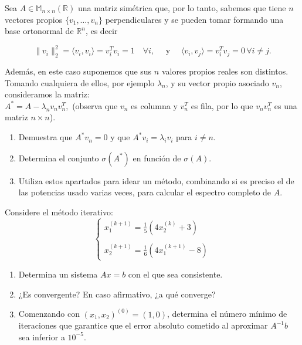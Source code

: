 \documentclass[12pt]{article}
\begin{document}
	\begin{ejercicio}[3 puntos]
		Sea $A \in \mathbb{M}_{n \times n}(\mathbb{R})$ una matriz simétrica que, por lo tanto, sabemos que tiene $n$ vectores propios $\{v_1, \dots, v_n\}$ perpendiculares y se pueden tomar formando una base ortonormal de $\mathbb{R}^n$, es decir
		
		$$\|v_i\|_2^2 = \langle v_i, v_i \rangle = v_i^T v_i = 1 \quad \forall i, \quad \text{ y } \quad \langle v_i, v_j \rangle = v_i^T v_j = 0 \, \forall i \neq j.$$
		
		Además, en este caso suponemos que sus $n$ valores propios reales son distintos. Tomando cualquiera de ellos, por ejemplo $\lambda_n$, y su vector propio asociado $v_n$, consideramos la matriz: \\
		
		$A^* = A - \lambda_n v_n v_n^T,$ (observa que $v_n$ es columna y $v_n^T$ es fila, por lo que $v_n v_n^T$ es una matriz $n \times n$).
		
		\begin{enumerate}[label=\alph*)]
			\item Demuestra que $A^* v_n = 0$ y que $A^* v_i = \lambda_i v_i$ para $i \neq n$. 
			
			\item Determina el conjunto $\sigma(A^*)$ en función de $\sigma(A)$.
			
			\item Utiliza estos apartados para idear un método, combinando si es preciso el de las potencias usado varias veces, para calcular el espectro completo de $A$.
		\end{enumerate}
	\end{ejercicio}	
	
	\begin{ejercicio}[3 puntos]
		Considere el método iterativo: 
		$$\begin{cases}
			x^{(k+1)}_1 = \displaystyle \frac{1}{5} (4 x^{(k)}_2 + 3) \\
			\\
			x^{(k+1)}_2 = \displaystyle \frac{1}{6} (4 x^{(k+1)}_1 - 8)
		\end{cases}$$
		
		\begin{enumerate}[label=\alph*)]
			\item Determina un sistema $Ax = b$ con el que sea consistente.
			
			\item ¿Es convergente? En caso afirmativo, ¿a qué converge?
			
			\item Comenzando con $(x_1, x_2)^{(0)} = (1,0)$, determina el número mínimo de iteraciones que garantice que el error absoluto cometido al aproximar $A^{-1}b$ sea inferior a $10^{-5}$.
			
		\end{enumerate}
	\end{ejercicio}
	
\end{document}
